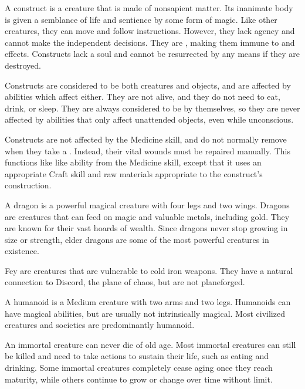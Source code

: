    A construct is a creature that is made of nonsapient matter.
  Its inanimate body is given a semblance of life and sentience by some form of magic.
  Like other creatures, they can move and follow instructions.
  However, they lack agency and cannot make the independent decisions.
  They are , making them immune to  and  effects.
  Constructs lack a soul and cannot be resurrected by any means if they are destroyed.

  Constructs are considered to be both creatures and objects, and are affected by abilities which affect either.
  They are not alive, and they do not need to eat, drink, or sleep.
  They are always considered to be  by themselves, so they are never affected by abilities that only affect unattended objects, even while unconscious.

  Constructs are not affected by the Medicine skill, and do not normally remove  when they take a .
  Instead, their vital wounds must be repaired manually.
  This functions like like  ability from the Medicine skill, except that it uses an appropriate Craft skill and raw materials appropriate to the construct's construction.

   A dragon is a powerful magical creature with four legs and two wings.
  Dragons are  creatures that can feed on magic and valuable metals, including gold. 
  They are known for their vast hoards of wealth.
  Since dragons never stop growing in size or strength, elder dragons are some of the most powerful creatures in existence.

  Fey are \magical creatures that are vulnerable to cold iron weapons.
  They have a natural connection to Discord, the plane of chaos, but are not planeforged.

  A humanoid is a Medium creature with two arms and two legs.
  Humanoids can have magical abilities, but are usually not intrinsically magical.
  Most civilized creatures and societies are predominantly humanoid.

  An immortal creature can never die of old age.
  Most immortal creatures can still be killed and need to take actions to sustain their life, such as eating and drinking.
  Some immortal creatures completely cease aging once they reach maturity, while others continue to grow or change over time without limit.

